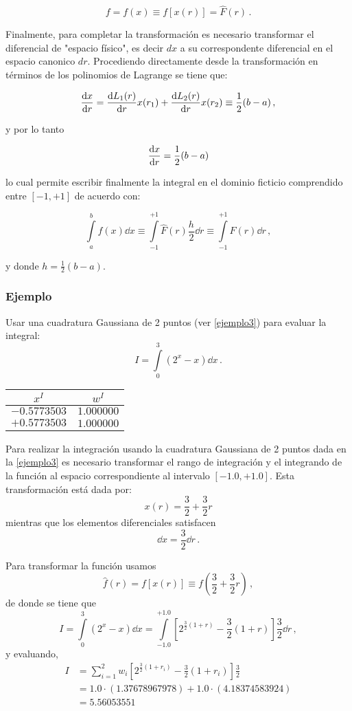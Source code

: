 \[f = f(x) \equiv f[x(r)] = \hat F(r)\, .\]

Finalmente, para completar la transformación es necesario transformar el diferencial de "espacio físico", es decir $dx$ a su correspondente diferencial en el espacio canonico $dr$. Procediendo directamente desde la transformación en términos de los polinomios de Lagrange se tiene que:

\[\dv{x}{r}  = \dv{L_1(r)}{r} x(r_1) + \dv{L_2(r)}{r} x(r_2) \equiv 
\frac{1}{2}(b - a)\, ,\]

y por lo tanto

\[\dv{x}{r} = \frac{1}{2}(b - a)\]

lo cual permite escribir finalmente la integral en el dominio ficticio comprendido entre $[-1, +1]$ de acuerdo con:

\[\int\limits_a^b f(x) \dd{x} \equiv \int\limits_{-1}^{+1} \hat F(r)\frac{h}{2} 
\dd{r} \equiv \int\limits_{-1}^{+1} F(r) \dd{r}\, , \]

y donde $h = \frac{1}{2}(b - a).$

\subsubsection*{Ejemplo}

Usar una cuadratura Gaussiana de 2 puntos (ver \cref{ejemplo3}) para evaluar la integral:
\[I = \int\limits_0^3 (2^x - x) \dd{x}\, . \]

\begin{center}
\begin{tabular}{cc}
  \hline
  $x^I$ & $w^I$ \\
  \hline 
  $-0.5773503$  & $1.000000$  \\
  $+0.5773503$  & $1.000000$  \\
  \hline
\end{tabular}
\label{ejemplo3}
\end{center}

Para realizar la integración usando la cuadratura Gaussiana de 2 puntos dada en la \cref{ejemplo3} es necesario transformar el rango de integración y el integrando de la función al espacio correspondiente al intervalo $[-1.0,+1.0]$. Esta transformación está dada por:
\[x(r) = \frac{3}{2} + \frac{3}{2}r\]
mientras que los elementos diferenciales satisfacen
\[\dd{x} = \frac{3}{2}\dd{r}\, .\]

Para transformar la función usamos
\[\hat f(r) = f[x(r)] \equiv f\left( \frac{3}{2} + \frac{3}{2}r \right)\, ,\]
de donde se tiene que
\[I = \int\limits_0^3 (2^x - x) \dd{x} = \int\limits_{-1.0}^{+1.0} \left[ 2^{\frac{3}{2}(1 + r)} - \frac{3}{2}(1 + r) \right] \frac{3}{2} \dd{r} \, ,\]
y evaluando,
\begin{align*}
  I &= \sum\limits_{i=1}^2 w_i\left[ 2^{\frac{3}{2}(1 + r_i)} - \frac{3}{2}(1 + 
  r_i) \right]\frac{3}{2}\\
  &= 1.0 \cdot (1.37678967978) + 1.0 \cdot (4.18374583924)\\
  &= 5.56053551
\end{align*}


